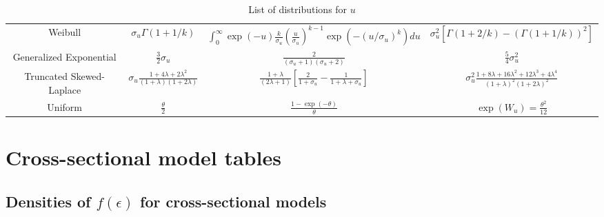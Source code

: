 \documentclass[nojss]{jss}
\begin{document}
\begin{appendix}
\begin{table}[h]
\begin{adjustbox}{max width=1\textwidth}
\begin{tabular}{@{}cccc@{}}
Weibull & $\sigma_u\Gamma\left(1+1/k\right)$ & 
$\int_0^\infty\exp{\left(-u\right)}\frac{k}{\sigma_u}\left(\frac{u}{\sigma_u}\right)^{k-1}\exp{\left(-\left(u/\sigma_u\right)^{k}\right)}du$ & 
$\sigma_u^2\left[\Gamma\left(1+2/k\right)-\left(\Gamma\left(1+1/k\right)\right)^2\right]$\\[1em]
Generalized Exponential & $\frac{3}{2}\sigma_u$ & $\frac{2}{\left(\sigma_u+1\right)\left(\sigma_u+2\right)}$ & $\frac{5}{4}\sigma_u^2$\\[1em]
Truncated Skewed-Laplace & $\sigma_u\frac{1+4\lambda+2\lambda^2}{\left(1+\lambda\right)\left(1+2\lambda\right)}$ & 
$\frac{1+\lambda}{\left(2\lambda+1\right)}\left[\frac{2}{1+\sigma_u}-\frac{1}{1+\lambda + \sigma_u}\right]$ & 
$\sigma_u^2\frac{1+8\lambda+16\lambda^2+12\lambda^3+4\lambda^4}{\left(1+\lambda\right)^2\left(1+2\lambda\right)^2}$\\[1em]
Uniform & $\frac{\theta}{2}$ & $\frac{1-\exp{\left(-\theta\right)}}{\theta}$ & $\exp{\left(W_u\right)}=\frac{\theta^2}{12}$\\[1em]
\bottomrule
\end{tabular}
\end{adjustbox}
\caption{List of distributions for $u$}
\label{table:momentdesn}
\end{table}

\newpage

\section{Cross-sectional model tables} \label{app:sfcross}

\setcounter{table}{0}

\subsection{Densities of $f(\epsilon)$ for cross-sectional models}


\end{appendix}
\end{document}
